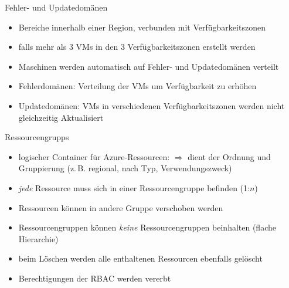 \begin{flashcard}[Definition]{Fehler- und Updatedomänen}
    \begin{itemize}
        \item Bereiche innerhalb einer Region, verbunden mit Verfügbarkeitszonen
        \item falls mehr als 3 VMs in den 3 Verfügbarkeitszonen erstellt werden
        \item Maschinen werden automatisch auf Fehler- und Updatedomänen verteilt
        \item Fehlerdomänen:\newline
            Verteilung der VMs um Verfügbarkeit zu erhöhen
        \item Updatedomänen:\newline
            VMs in verschiedenen Verfügbarkeitszonen werden nicht gleichzeitig Aktualisiert
    \end{itemize}
\end{flashcard}

\begin{flashcard}[Definition]{Ressourcengrupps}
    \begin{itemize}
        \item logischer Container für Azure-Ressourcen:\newline
        $\Rightarrow$ dient der Ordnung und Gruppierung (z.\,B. regional, nach Typ, Verwendungszweck)
        \item \emph{jede} Ressource muss sich in einer Ressourcengruppe befinden (1:$n$)
        \item Ressourcen können in andere Gruppe verschoben werden
        \item Ressourcengruppen können \emph{keine} Ressourcengruppen beinhalten (flache Hierarchie)
        \item beim Löschen werden alle enthaltenen Ressourcen ebenfalls gelöscht
        \item Berechtigungen der RBAC werden vererbt
    \end{itemize}

\end{flashcard}

